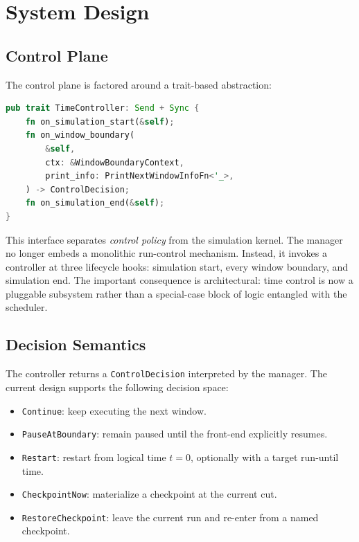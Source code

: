 \documentclass[11pt,a4paper]{article}
\begin{document}
\section{System Design}

\subsection{Control Plane}

The control plane is factored around a trait-based abstraction:

\begin{lstlisting}[language=Rust]
pub trait TimeController: Send + Sync {
    fn on_simulation_start(&self);
    fn on_window_boundary(
        &self,
        ctx: &WindowBoundaryContext,
        print_info: PrintNextWindowInfoFn<'_>,
    ) -> ControlDecision;
    fn on_simulation_end(&self);
}
\end{lstlisting}

This interface separates \emph{control policy} from the simulation kernel.
The manager no longer embeds a monolithic run-control mechanism. Instead, it
invokes a controller at three lifecycle hooks: simulation start, every window
boundary, and simulation end. The important consequence is architectural:
time control is now a pluggable subsystem rather than a special-case block of
logic entangled with the scheduler.

\subsection{Decision Semantics}

The controller returns a \texttt{ControlDecision} interpreted by the manager.
The current design supports the following decision space:

\begin{itemize}[leftmargin=1.7em]
  \item \texttt{Continue}: keep executing the next window.
  \item \texttt{PauseAtBoundary}: remain paused until the front-end explicitly
  resumes.
  \item \texttt{Restart}: restart from logical time \(t=0\), optionally with a
  target run-until time.
  \item \texttt{CheckpointNow}: materialize a checkpoint at the current cut.
  \item \texttt{RestoreCheckpoint}: leave the current run and re-enter from a
  named checkpoint.
\end{itemize}
\end{document}
